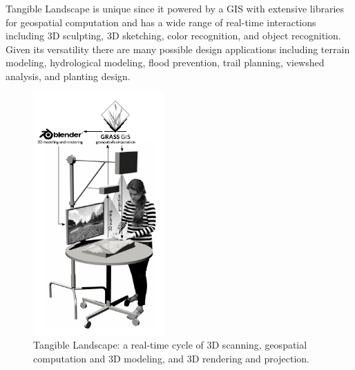 \documentclass[Afour,sageh,times]{sagej}
\begin{document}
Tangible Landscape 
is unique since it powered by a GIS
with extensive libraries for geospatial computation
and has a wide range of real-time interactions including 
3D sculpting, 3D sketching, color recognition, and object recognition.
%
Given its versatility 
there are many possible design applications
including terrain modeling, hydrological modeling, flood prevention,
trail planning, viewshed analysis, and planting design. 

\begin{figure}
    \begin{center}
        \includegraphics[width=0.45\textwidth]{images/diagrams/rendered_diagram_2.pdf}
        \caption{Tangible Landscape: a real-time cycle of 3D scanning, geospatial computation and 3D modeling, and 3D rendering and projection.}
        \label{fig:system_diagram}
    \end{center}
\end{figure}
\end{document}
